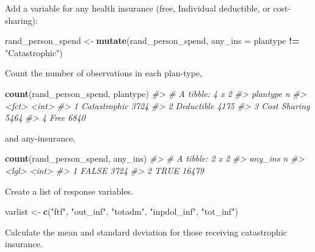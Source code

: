 \documentclass[]{book}
\newenvironment{Shaded}{\begin{snugshade}}{\end{snugshade}}
\newcommand{\KeywordTok}[1]{\textcolor[rgb]{0.13,0.29,0.53}{\textbf{#1}}}
\newcommand{\DataTypeTok}[1]{\textcolor[rgb]{0.13,0.29,0.53}{#1}}
\newcommand{\StringTok}[1]{\textcolor[rgb]{0.31,0.60,0.02}{#1}}
\newcommand{\CommentTok}[1]{\textcolor[rgb]{0.56,0.35,0.01}{\textit{#1}}}
\newcommand{\OperatorTok}[1]{\textcolor[rgb]{0.81,0.36,0.00}{\textbf{#1}}}
\newcommand{\NormalTok}[1]{#1}
\theoremstyle{definition}
\theoremstyle{definition}
\theoremstyle{definition}
\theoremstyle{remark}
\begin{document}
Add a variable for any health insurance (free, Individual deductible, or
cost-sharing):

\begin{Shaded}
\begin{Highlighting}[]
\NormalTok{rand_person_spend <-}\StringTok{ }\KeywordTok{mutate}\NormalTok{(rand_person_spend,}
                            \DataTypeTok{any_ins =}\NormalTok{ plantype }\OperatorTok{!=}\StringTok{ "Catastrophic"}\NormalTok{)}
\end{Highlighting}
\end{Shaded}

Count the number of observations in each plan-type,

\begin{Shaded}
\begin{Highlighting}[]
\KeywordTok{count}\NormalTok{(rand_person_spend, plantype)}
\CommentTok{#> # A tibble: 4 x 2}
\CommentTok{#>   plantype         n}
\CommentTok{#>   <fct>        <int>}
\CommentTok{#> 1 Catastrophic  3724}
\CommentTok{#> 2 Deductible    4175}
\CommentTok{#> 3 Cost Sharing  5464}
\CommentTok{#> 4 Free          6840}
\end{Highlighting}
\end{Shaded}

and any-insurance,

\begin{Shaded}
\begin{Highlighting}[]
\KeywordTok{count}\NormalTok{(rand_person_spend, any_ins)}
\CommentTok{#> # A tibble: 2 x 2}
\CommentTok{#>   any_ins     n}
\CommentTok{#>   <lgl>   <int>}
\CommentTok{#> 1 FALSE    3724}
\CommentTok{#> 2 TRUE    16479}
\end{Highlighting}
\end{Shaded}

Create a list of response variables.

\begin{Shaded}
\begin{Highlighting}[]
\NormalTok{varlist <-}\StringTok{ }\KeywordTok{c}\NormalTok{(}\StringTok{"ftf"}\NormalTok{, }\StringTok{"out_inf"}\NormalTok{, }\StringTok{"totadm"}\NormalTok{, }\StringTok{"inpdol_inf"}\NormalTok{, }\StringTok{"tot_inf"}\NormalTok{)}
\end{Highlighting}
\end{Shaded}

Calculate the mean and standard deviation for those receiving
catastrophic insurance.
\end{document}
